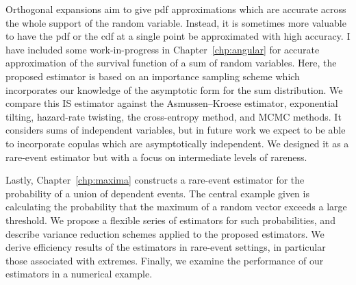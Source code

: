 


Orthogonal expansions aim to give pdf approximations which are accurate across the whole support of the random variable. Instead, it is sometimes more valuable to have the pdf or the cdf at a single point be approximated with high accuracy. I have included some work-in-progress in Chapter~\ref{chp:angular} for accurate approximation of the survival function of a sum of random variables. Here, the proposed estimator is based on an importance sampling scheme which incorporates our knowledge of the asymptotic form for the sum distribution. We compare this IS estimator against the Asmussen--Kroese estimator, exponential tilting, hazard-rate twisting, the cross-entropy method, and MCMC methods. It considers sums of independent variables, but in future work we expect to be able to incorporate copulas which are asymptotically independent. We designed it as a rare-event estimator but with a focus on intermediate levels of rareness.

Lastly, Chapter~\ref{chp:maxima} constructs a rare-event estimator for the probability of a union of dependent events. The central example given is calculating the probability that the maximum of a random vector exceeds a large threshold. We propose a flexible series of estimators for such probabilities, and describe variance reduction schemes applied to the proposed estimators. We derive efficiency results of the estimators in rare-event settings, in particular those associated with extremes. Finally, we examine the performance of our estimators in a numerical example.
